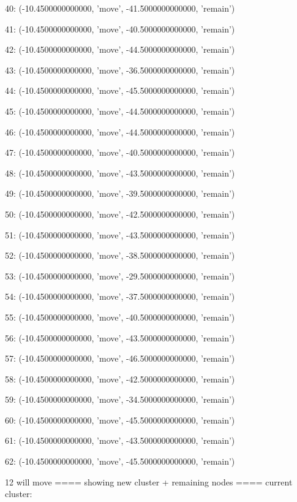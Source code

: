 40: (-10.4500000000000, 'move', -41.5000000000000, 'remain')


41: (-10.4500000000000, 'move', -40.5000000000000, 'remain')


42: (-10.4500000000000, 'move', -44.5000000000000, 'remain')


43: (-10.4500000000000, 'move', -36.5000000000000, 'remain')


44: (-10.4500000000000, 'move', -45.5000000000000, 'remain')


45: (-10.4500000000000, 'move', -44.5000000000000, 'remain')


46: (-10.4500000000000, 'move', -44.5000000000000, 'remain')


47: (-10.4500000000000, 'move', -40.5000000000000, 'remain')


48: (-10.4500000000000, 'move', -43.5000000000000, 'remain')


49: (-10.4500000000000, 'move', -39.5000000000000, 'remain')


50: (-10.4500000000000, 'move', -42.5000000000000, 'remain')


51: (-10.4500000000000, 'move', -43.5000000000000, 'remain')


52: (-10.4500000000000, 'move', -38.5000000000000, 'remain')


53: (-10.4500000000000, 'move', -29.5000000000000, 'remain')


54: (-10.4500000000000, 'move', -37.5000000000000, 'remain')


55: (-10.4500000000000, 'move', -40.5000000000000, 'remain')


56: (-10.4500000000000, 'move', -43.5000000000000, 'remain')


57: (-10.4500000000000, 'move', -46.5000000000000, 'remain')


58: (-10.4500000000000, 'move', -42.5000000000000, 'remain')


59: (-10.4500000000000, 'move', -34.5000000000000, 'remain')


60: (-10.4500000000000, 'move', -45.5000000000000, 'remain')


61: (-10.4500000000000, 'move', -43.5000000000000, 'remain')


62: (-10.4500000000000, 'move', -45.5000000000000, 'remain')


12 will move
==== showing new cluster + remaining nodes ====
current cluster:


